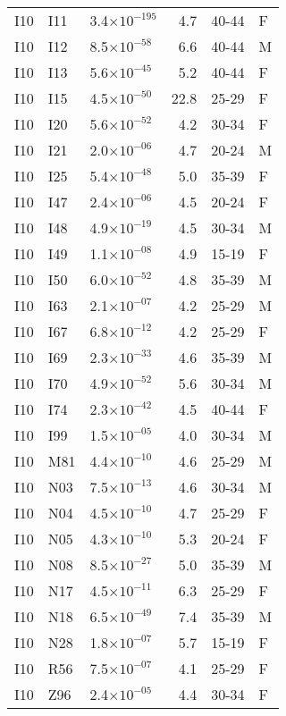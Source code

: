 \begin{longtable}{lllrll}
   I10 & I11 & 3.4$\times10^{-195}$ & 4.7 & 40-44 & F \\ 
   I10 & I12 & 8.5$\times10^{-58}$ & 6.6 & 40-44 & M \\ 
   I10 & I13 & 5.6$\times10^{-45}$ & 5.2 & 40-44 & F \\ 
   I10 & I15 & 4.5$\times10^{-50}$ & 22.8 & 25-29 & F \\ 
   I10 & I20 & 5.6$\times10^{-52}$ & 4.2 & 30-34 & F \\ 
   I10 & I21 & 2.0$\times10^{-06}$ & 4.7 & 20-24 & M \\ 
   I10 & I25 & 5.4$\times10^{-48}$ & 5.0 & 35-39 & F \\ 
   I10 & I47 & 2.4$\times10^{-06}$ & 4.5 & 20-24 & F \\ 
   I10 & I48 & 4.9$\times10^{-19}$ & 4.5 & 30-34 & M \\ 
   I10 & I49 & 1.1$\times10^{-08}$ & 4.9 & 15-19 & F \\ 
   I10 & I50 & 6.0$\times10^{-52}$ & 4.8 & 35-39 & M \\ 
   I10 & I63 & 2.1$\times10^{-07}$ & 4.2 & 25-29 & M \\ 
   I10 & I67 & 6.8$\times10^{-12}$ & 4.2 & 25-29 & F \\ 
   I10 & I69 & 2.3$\times10^{-33}$ & 4.6 & 35-39 & M \\ 
   I10 & I70 & 4.9$\times10^{-52}$ & 5.6 & 30-34 & M \\ 
   I10 & I74 & 2.3$\times10^{-42}$ & 4.5 & 40-44 & F \\ 
   I10 & I99 & 1.5$\times10^{-05}$ & 4.0 & 30-34 & M \\ 
   I10 & M81 & 4.4$\times10^{-10}$ & 4.6 & 25-29 & M \\ 
   I10 & N03 & 7.5$\times10^{-13}$ & 4.6 & 30-34 & M \\ 
   I10 & N04 & 4.5$\times10^{-10}$ & 4.7 & 25-29 & F \\ 
   I10 & N05 & 4.3$\times10^{-10}$ & 5.3 & 20-24 & F \\ 
   I10 & N08 & 8.5$\times10^{-27}$ & 5.0 & 35-39 & M \\ 
   I10 & N17 & 4.5$\times10^{-11}$ & 6.3 & 25-29 & F \\ 
   I10 & N18 & 6.5$\times10^{-49}$ & 7.4 & 35-39 & M \\ 
   I10 & N28 & 1.8$\times10^{-07}$ & 5.7 & 15-19 & F \\ 
   I10 & R56 & 7.5$\times10^{-07}$ & 4.1 & 25-29 & F \\ 
   I10 & Z96 & 2.4$\times10^{-05}$ & 4.4 & 30-34 & F \\ 

\end{longtable}
